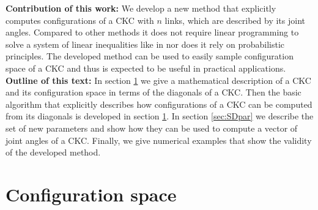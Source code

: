 \documentclass[10pt,a4paper]{article}
\theoremstyle{definition}
\theoremstyle{remark}
\numberwithin{equation}{section}
\begin{document}
\textbf{Contribution of this work:} We develop a new method that explicitly computes configurations of a CKC with $n$ links, which are described by its joint angles. Compared to other methods it does not require linear programming to solve a system of linear inequalities like in \cite{HanRudBlumVal,han2008conv} nor does it rely on probabilistic principles. The developed  method can be used to easily sample configuration space of a CKC and thus is expected to be useful in practical applications.\\ 


\textbf{Outline of this text:} In section \ref{sec:sampling} we give a mathematical description of a CKC and its configuration space in terms of the diagonals of a CKC. Then the basic algorithm that explicitly describes how configurations of a CKC can be computed from its diagonals is developed in section \ref{sec:sampling}. In section \ref{sec:SDpar} we describe the set of new parameters and show how they can be used to compute a vector of joint angles of  a CKC. Finally,  we give  numerical examples that show the validity of the developed method.     


\section{Configuration space}\label{sec:sampling}
\end{document}
